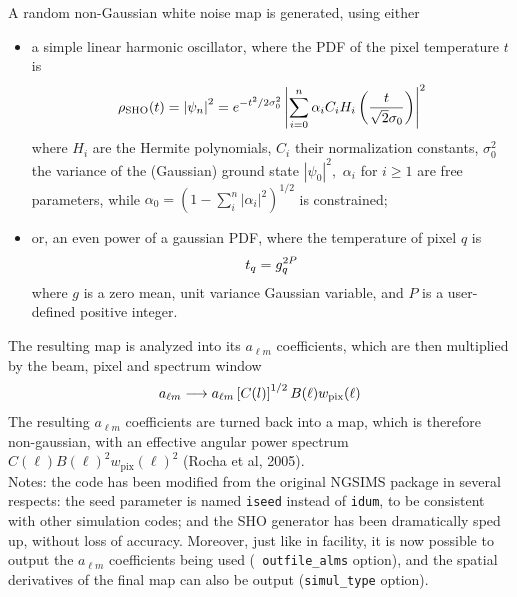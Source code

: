 \begin{codedescription}
{%
A random non-Gaussian white noise map is generated, using either
\begin{itemize}
%
\item a simple linear harmonic oscillator, where the PDF of the pixel
temperature $t$ is
	\begin{eqnarray}
	\rho_{\rm SHO}(t) = \left| \psi_n\right|^2 = e^{-t^2/2\sigma_0^2} \left|\sum_{i=0}^{n} \alpha_i
C_i H_i \left(\frac{t}{\sqrt{2}\sigma_0}\right)\right|^2 \label{eq:nongauss_sho}
	\end{eqnarray}
where $H_i$ are the Hermite polynomials, $C_i$ their normalization constants,
$\sigma_0^2$ the variance of the (Gaussian) ground state $\left|\psi_0\right|^2,$
$\alpha_i$ for $i\ge 1$ are free parameters, while $\alpha_0 =
\left(1 - \sum_i^n |\alpha_i|^2\right)^{1/2}$ is constrained;
%
\item or, an even power of a gaussian PDF, where the temperature of pixel $q$ is
	\begin{eqnarray}
	t_q = g_q^{2 P} \label{eq:nongauss_powgauss}
	\end{eqnarray}
where $g$ is a zero mean, unit variance Gaussian variable, and $P$ is
a user-defined positive integer.
\end{itemize}
The resulting map is analyzed into its $a_{\ell m}$ coefficients, which are then
multiplied by the beam, pixel and spectrum window
\begin{eqnarray}
	a_{\ell m} \longrightarrow a_{\ell m} \left[C(l)\right]^{1/2} B(\ell) w_{\rm pix}(\ell) \nonumber
\end{eqnarray}
The resulting $a_{\ell m}$ coefficients are turned back into a map, which is
therefore non-gaussian, with an effective angular power spectrum $C(\ell) B(\ell)^2
w_\mathrm{pix}(\ell)^2$ (Rocha et al, 2005).
\\
Notes: the code has been modified from the original NGSIMS package in several
respects:
the seed parameter is named {\tt iseed} instead of {\tt idum}, to be consistent
with other \healpix simulation codes; and the SHO generator has been
dramatically sped up, without loss of accuracy. Moreover, just like in  facility,
it is now possible to output the $a_{\ell m}$ coefficients being used ({\tt
outfile\_alms} option), and the spatial derivatives of the final map can also be
output ({\tt simul\_type} option).
}
\end{codedescription}


